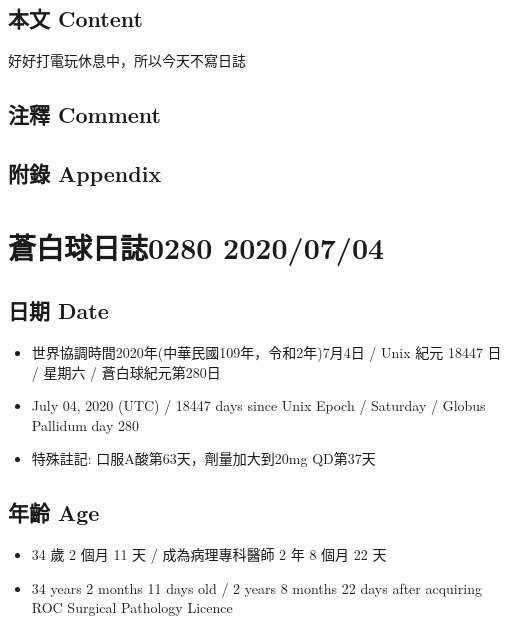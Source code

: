 \documentclass[
]{article}
\providecommand{\tightlist}{%
  \setlength{\itemsep}{0pt}\setlength{\parskip}{0pt}}
\begin{document}
\hypertarget{ux672cux6587-content-2}{%
\subsection{本文 Content}\label{ux672cux6587-content-2}}

好好打電玩休息中，所以今天不寫日誌

\hypertarget{ux6ce8ux91cb-comment-2}{%
\subsection{注釋 Comment}\label{ux6ce8ux91cb-comment-2}}

\hypertarget{ux9644ux9304-appendix-2}{%
\subsection{附錄 Appendix}\label{ux9644ux9304-appendix-2}}

\hypertarget{ux84bcux767dux7403ux65e5ux8a8c0280-20200704}{%
\section{蒼白球日誌0280
2020/07/04}\label{ux84bcux767dux7403ux65e5ux8a8c0280-20200704}}

\hypertarget{ux65e5ux671f-date-3}{%
\subsection{日期 Date}\label{ux65e5ux671f-date-3}}

\begin{itemize}
\tightlist
\item
  世界協調時間2020年(中華民國109年，令和2年)7月4日 / Unix 紀元 18447 日
  / 星期六 / 蒼白球紀元第280日
\item
  July 04, 2020 (UTC) / 18447 days since Unix Epoch / Saturday / Globus
  Pallidum day 280
\item
  特殊註記: 口服A酸第63天，劑量加大到20mg QD第37天
\end{itemize}

\hypertarget{ux5e74ux9f61-age-3}{%
\subsection{年齡 Age}\label{ux5e74ux9f61-age-3}}

\begin{itemize}
\tightlist
\item
  34 歲 2 個月 11 天 / 成為病理專科醫師 2 年 8 個月 22 天
\item
  34 years 2 months 11 days old / 2 years 8 months 22 days after
  acquiring ROC Surgical Pathology Licence
\end{itemize}
\end{document}
